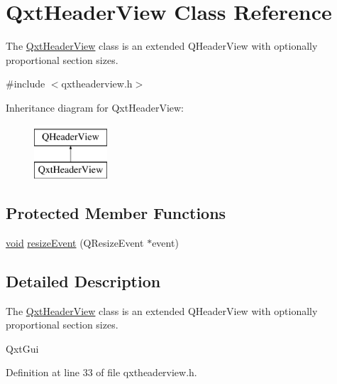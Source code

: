 \hypertarget{class_qxt_header_view}{\section{Qxt\-Header\-View Class Reference}
\label{class_qxt_header_view}
}


The \hyperlink{class_qxt_header_view}{Qxt\-Header\-View} class is an extended Q\-Header\-View with optionally proportional section sizes.  




{\ttfamily \#include $<$qxtheaderview.\-h$>$}

Inheritance diagram for Qxt\-Header\-View\-:\begin{figure}[H]
\begin{center}
\leavevmode
\includegraphics[height=2.000000cm]{class_qxt_header_view}
\end{center}
\end{figure}
\subsection*{Protected Member Functions}
\begin{DoxyCompactItemize}
\item 
\hyperlink{group___u_a_v_objects_plugin_ga444cf2ff3f0ecbe028adce838d373f5c}{void} \hyperlink{class_qxt_header_view_a11840edc9416681d4294ae702a349077}{resize\-Event} (Q\-Resize\-Event $\ast$event)
\end{DoxyCompactItemize}


\subsection{Detailed Description}
The \hyperlink{class_qxt_header_view}{Qxt\-Header\-View} class is an extended Q\-Header\-View with optionally proportional section sizes. 

Qxt\-Gui 

Definition at line 33 of file qxtheaderview.\-h.




